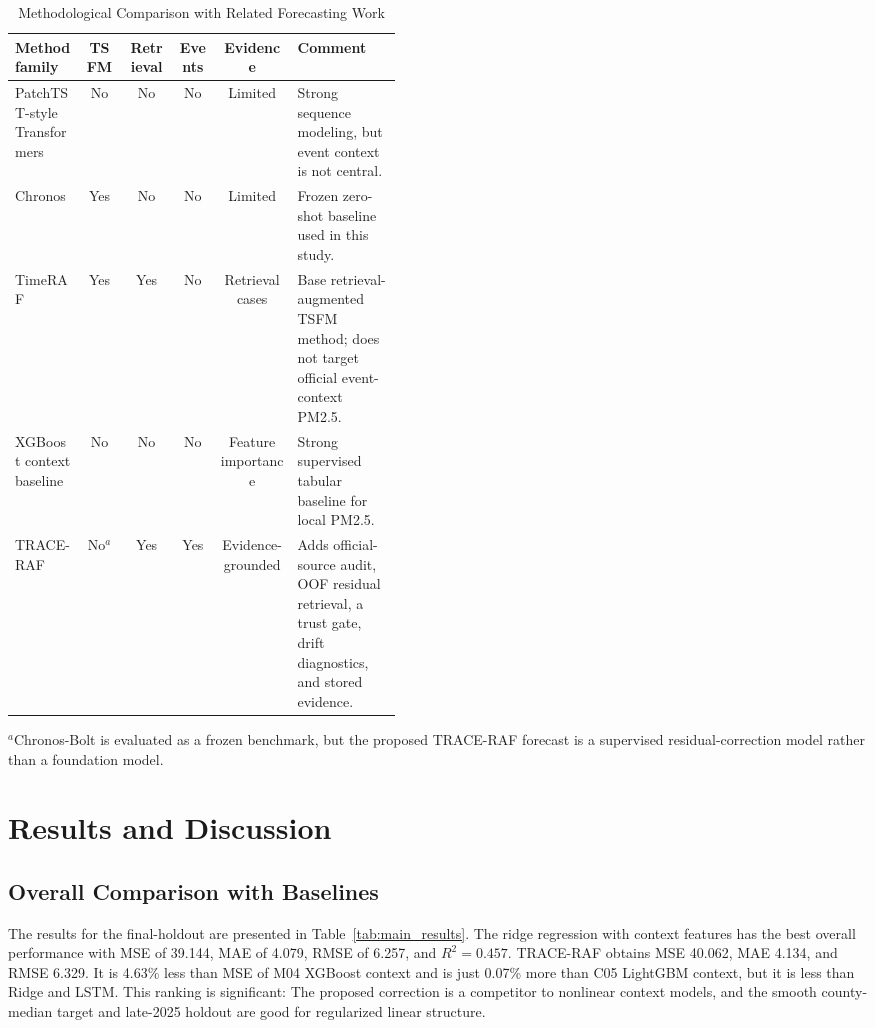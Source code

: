 \documentclass{ieeeaccess}
\begin{document}
\begin{table}[!t]
\centering
\caption{Methodological Comparison with Related Forecasting Work}
\label{tab:literature_positioning}
\begin{tabular}{p{0.18\linewidth}ccccp{0.27\linewidth}}
\toprule
Method family & TSFM & Retrieval & Events & Evidence & Comment \\
\midrule
PatchTST-style Transformers \cite{nie2023patchtst} & No & No & No & Limited &
Strong sequence modeling, but event context is not central. \\
Chronos \cite{ansari2024chronos} & Yes & No & No & Limited & Frozen
zero-shot baseline used in this study. \\
TimeRAF \cite{zhang2025timeraf} & Yes & Yes & No & Retrieval cases & Base
retrieval-augmented TSFM method; does not target official event-context PM2.5. \\
XGBoost context baseline \cite{chen2016xgboost} & No & No & No & Feature
importance & Strong supervised tabular baseline for local PM2.5. \\
TRACE-RAF & No$^{a}$ & Yes & Yes & Evidence-grounded & Adds official-source
audit, OOF residual retrieval, a trust gate, drift diagnostics, and stored
evidence. \\
\bottomrule
\end{tabular}
\vspace{2pt}\parbox{0.96\textwidth}{\footnotesize $^{a}$Chronos-Bolt is
evaluated as a frozen benchmark, but the proposed TRACE-RAF forecast is a
supervised residual-correction model rather than a foundation model.}
\end{table}

\section{Results and Discussion}

\subsection{Overall Comparison with Baselines}
The results for the final-holdout are presented in Table~\ref{tab:main_results}. The ridge regression with context features has the best overall performance with MSE of 39.144, MAE of 4.079, RMSE of 6.257, and $R^2=0.457$. TRACE-RAF obtains MSE 40.062, MAE 4.134, and RMSE 6.329. It is 4.63\% less than MSE of M04 XGBoost context and is just 0.07\% more than C05 LightGBM context, but it is less than Ridge and LSTM. This ranking is significant: The proposed correction is a competitor to nonlinear context models, and the smooth county-median target and late-2025 holdout are good for regularized linear structure.
\end{document}
